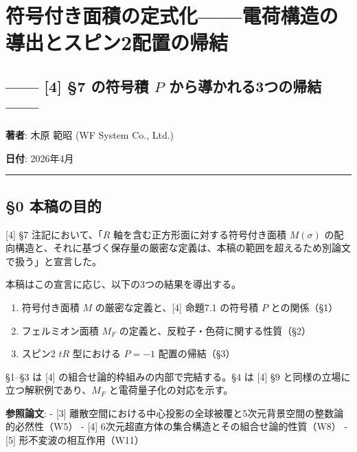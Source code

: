 \documentclass[
  a4paper,11pt]{ltjsarticle}
\author{}
\date{}
\providecommand{\tightlist}{%
  \setlength{\itemsep}{0pt}\setlength{\parskip}{0pt}}
\begin{document}
\section{符号付き面積の定式化------電荷構造の導出とスピン2配置の帰結}\label{ux7b26ux53f7ux4ed8ux304dux9762ux7a4dux306eux5b9aux5f0fux5316ux96fbux8377ux69cbux9020ux306eux5c0eux51faux3068ux30b9ux30d4ux30f32ux914dux7f6eux306eux5e30ux7d50}

\subsection{\texorpdfstring{------ {[}4{]} §7 の符号積 \(P\)
から導かれる3つの帰結
------}{------ {[}4{]} §7 の符号積 P から導かれる3つの帰結 ------}}\label{ux306eux7b26ux53f7ux7a4d-p-ux304bux3089ux5c0eux304bux308cux308b3ux3064ux306eux5e30ux7d50}

\textbf{著者}: 木原 範昭 (WF System Co., Ltd.)

\textbf{日付}: 2026年4月

\begin{center}\rule{0.5\linewidth}{0.5pt}\end{center}

\subsection{§0 本稿の目的}\label{ux672cux7a3fux306eux76eeux7684}

{[}4{]} §7 注記において、「\(R\) 軸を含む正方形面に対する符号付き面積
\(M(\sigma)\)
の配向構造と、それに基づく保存量の厳密な定義は、本稿の範囲を超えるため別論文で扱う」と宣言した。

本稿はこの宣言に応じ、以下の3つの結果を導出する。

\begin{enumerate}
\def\labelenumi{\arabic{enumi}.}
\tightlist
\item
  符号付き面積 \(M\) の厳密な定義と、{[}4{]} 命題7.1 の符号積 \(P\)
  との関係（§1）
\item
  フェルミオン面積 \(M_F\) の定義と、反粒子・色荷に関する性質（§2）
\item
  スピン2 \(tR\) 型における \(P = -1\) 配置の帰結（§3）
\end{enumerate}

§1--§3 は {[}4{]} の組合せ論的枠組みの内部で完結する。§4 は {[}4{]} §9
と同様の立場に立つ解釈例であり、\(M_F\) と電荷量子化の対応を示す。

\textbf{参照論文}: - {[}3{]}
離散空間における中心投影の全球被覆と5次元背景空間の整数論的必然性（W5）
- {[}4{]} 6次元超直方体の集合構造とその組合せ論的性質（W8） - {[}5{]}
形不変波の相互作用（W11）
\end{document}
